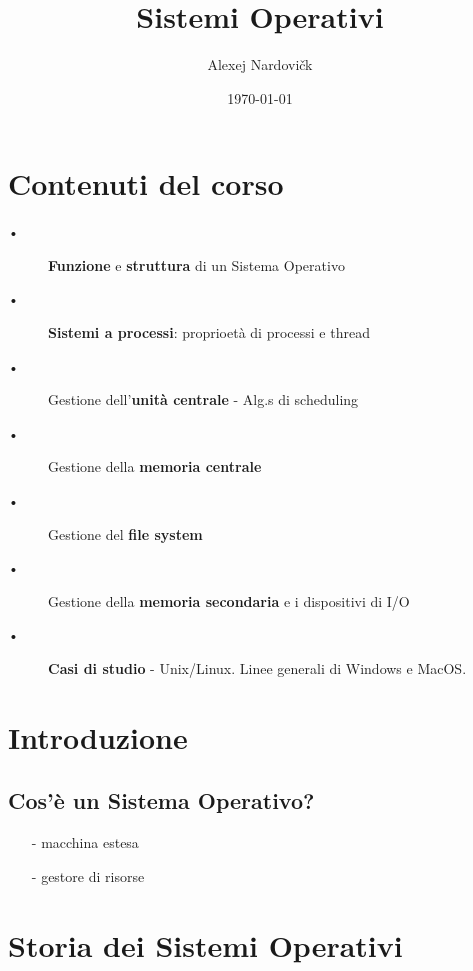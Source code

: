 \documentclass[12pt, letterpaper]{article}
\title{Sistemi Operativi}
\author{Alexej Nardovičk}
\date{\today}
\begin{document}
\maketitle

\section{Contenuti del corso}

\begin{description}
   \item[•] \textbf{Funzione} e \textbf{struttura} di un Sistema Operativo
   \item[•] \textbf{Sistemi a processi}: proprioetà di processi e thread
   \item[•] Gestione dell'\textbf{unità centrale} - Alg.s di scheduling
   \item[•] Gestione della \textbf{memoria centrale}
   \item[•] Gestione del \textbf{file system}
   \item[•] Gestione della \textbf{memoria secondaria} e i dispositivi di I/O
   \item[•] \textbf{Casi di studio} - Unix/Linux. Linee generali di Windows e MacOS.
\end{description}

\newpage

\tableofcontents

\newpage

\section{Introduzione}

\subsection{\textbf{Cos'è un Sistema Operativo}?}
\begin{itemize}
\item[-] macchina estesa
\item[-] gestore di risorse
\end{itemize}

\section{Storia dei Sistemi Operativi}
\end{document}
